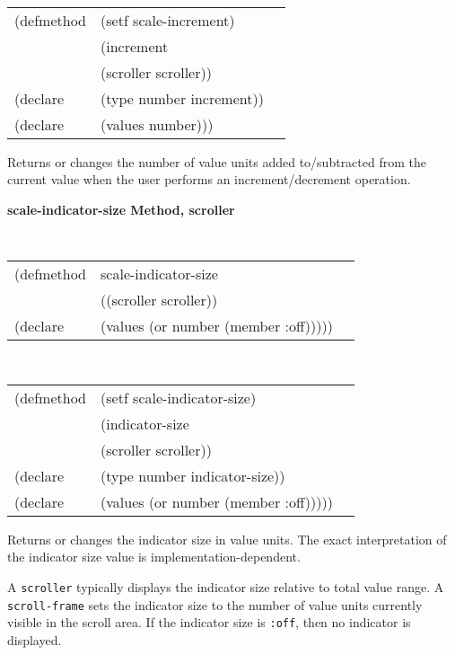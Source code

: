 \begin{flushright} \parbox[t]{6.125in}{
\tt
\begin{tabular}{lll}
\raggedright
(defmethod & (setf scale-increment) & \\
         & (increment \\
         & (scroller  scroller)) \\
(declare &(type number  increment))\\
(declare & (values number)))
\end{tabular}
\rm}
\end{flushright}

\begin{flushright} \parbox[t]{6.125in}{
Returns or changes the number of value units added to/subtracted from the
current value when the user performs an increment/decrement operation.}
\end{flushright}




{\samepage  
{\large {\bf scale-indicator-size \hfill Method, scroller}}
\begin{flushright} \parbox[t]{6.125in}{
\tt
\begin{tabular}{lll}
\raggedright
(defmethod & scale-indicator-size & \\
& ((scroller  scroller)) \\
(declare & (values (or number (member :off)))))
\end{tabular}
\rm

}\end{flushright}}

\begin{flushright} \parbox[t]{6.125in}{
\tt
\begin{tabular}{lll}
\raggedright
(defmethod & (setf scale-indicator-size) & \\
         & (indicator-size \\
         & (scroller  scroller)) \\
(declare &(type number  indicator-size))\\
(declare & (values (or number (member :off)))))
\end{tabular}
\rm}
\end{flushright}

\begin{flushright} \parbox[t]{6.125in}{
Returns or changes the indicator size in value units. The exact interpretation
of the indicator size value is implementation-dependent.

A {\tt scroller} typically displays the indicator size relative to total value
range. A {\tt scroll-frame} sets the indicator size to the
number of value units currently visible in the scroll area.
If the indicator size is {\tt :off}, then no indicator is displayed.
}
\end{flushright}




